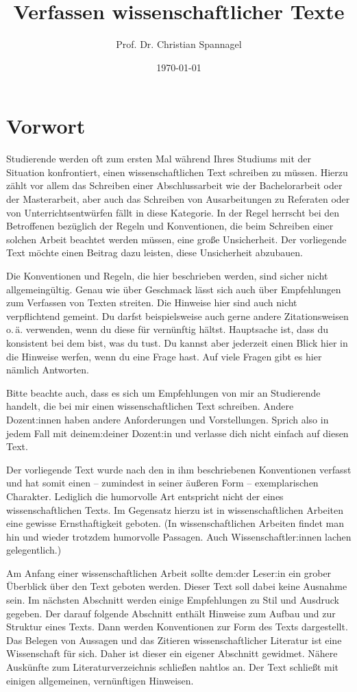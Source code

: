 \documentclass{../cssheet}
\title{Verfassen wissenschaftlicher Texte}
\author{Prof. Dr. Christian Spannagel}
\date{\today}
\begin{document}
\printtitle
\printdate
\singlespacing

\tableofcontents

\section{Vorwort}

Studierende werden oft zum ersten Mal während Ihres Studiums mit der
Situation konfrontiert, einen wissenschaftlichen Text schreiben zu
müssen. Hierzu zählt vor allem das Schreiben einer Abschlussarbeit wie
der Bachelorarbeit oder der Masterarbeit, aber auch das
Schreiben von Ausarbeitungen zu Referaten oder von Unterrichtsentwürfen
fällt in diese Kategorie. In der Regel herrscht bei den Betroffenen
bezüglich der Regeln und Konventionen, die beim Schreiben einer solchen
Arbeit beachtet werden müssen, eine große Unsicherheit. Der vorliegende
Text möchte einen Beitrag dazu leisten, diese Unsicherheit abzubauen.

Die Konventionen und Regeln, die hier beschrieben werden, sind sicher
nicht all\-ge\-mein\-gül\-tig. Genau wie über Geschmack lässt sich auch über
Empfehlungen zum Verfassen von Texten streiten. Die Hinweise hier sind
auch nicht verpflichtend gemeint. Du darfst beispielsweise auch gerne
andere Zitationsweisen o.\,ä. verwenden, wenn du diese für vernünftig
hältst. Hauptsache ist, dass du konsistent bei dem bist, was du tust. Du
kannst aber jederzeit einen Blick hier in die Hinweise werfen, wenn du
eine Frage hast. Auf viele Fragen gibt es hier nämlich Antworten.

Bitte beachte auch, dass es sich um Empfehlungen von mir an Studierende handelt, die bei mir einen wissenschaftlichen Text schreiben. Andere Dozent:innen haben andere Anforderungen und Vorstellungen. Sprich also in jedem Fall mit deinem:deiner Dozent:in und verlasse dich nicht einfach auf diesen Text.

Der vorliegende Text wurde nach den in ihm beschriebenen Konventionen
verfasst und hat somit einen -- zumindest in seiner äußeren Form --
exemplarischen Charakter. Lediglich die humorvolle Art entspricht nicht
der eines wissenschaftlichen Texts. Im Gegensatz hierzu ist in
wissenschaftlichen Arbeiten eine gewisse Ernsthaftigkeit geboten. (In
wissenschaftlichen Arbeiten findet man hin und wieder trotzdem
humorvolle Passagen. Auch Wissenschaftler:innen lachen gelegentlich.)

Am Anfang einer wissenschaftlichen Arbeit sollte dem:der Leser:in ein grober
Überblick über den Text geboten werden. Dieser Text soll dabei keine
Ausnahme sein. Im nächsten Abschnitt werden einige Empfehlungen zu Stil
und Ausdruck gegeben. Der darauf folgende Abschnitt enthält Hinweise zum Aufbau
und zur Struktur eines Texts. Dann werden Konventionen zur Form des
Texts dargestellt. Das Belegen von Aussagen und das Zitieren
wissenschaftlicher Literatur ist eine Wissenschaft für sich. Daher ist
dieser ein eigener Abschnitt gewidmet. Nähere Auskünfte zum
Literaturverzeichnis schließen nahtlos an. Der Text schließt mit einigen
allgemeinen, vernünftigen Hinweisen.
\end{document}
